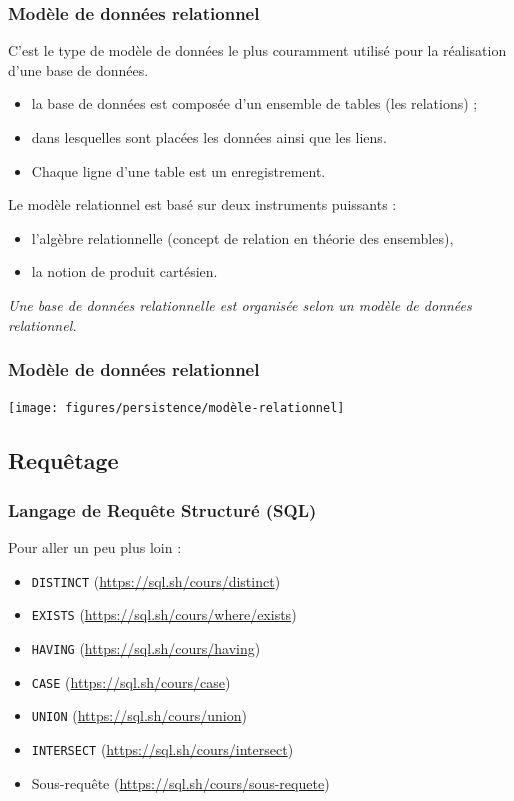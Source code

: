 \begin{frame}
    \frametitle{Modèle de données relationnel}

    C'est le type de modèle de données le plus couramment utilisé pour la réalisation d'une base de données.
    \begin{itemize}
        \item la base de données est composée d'un ensemble de tables (les relations) ;
        \item dans lesquelles sont placées les données ainsi que les liens.
        \item Chaque ligne d'une table est un enregistrement.
    \end{itemize}

    \bigskip
    Le modèle relationnel est basé sur deux instruments puissants :
    \begin{itemize}
        \item l’algèbre relationnelle (concept de relation en théorie des ensembles),
        \item la notion de produit cartésien.
    \end{itemize}

    \bigskip
    \emph{Une base de données relationnelle est organisée selon un modèle de données relationnel.}

\end{frame}

\begin{frame}
    \frametitle{Modèle de données relationnel}

    \centering
    \texttt{[image: figures/persistence/modèle-relationnel]}
\end{frame}

\subsection{Requêtage}

\begin{frame}
    \frametitle{Langage de Requête Structuré (SQL)}

    Pour aller un peu plus loin :
    \begin{itemize}
        \item \texttt{DISTINCT} (\url{https://sql.sh/cours/distinct})
        \item \texttt{EXISTS} (\url{https://sql.sh/cours/where/exists})
        \item \texttt{HAVING} (\url{https://sql.sh/cours/having})
        \item \texttt{CASE} (\url{https://sql.sh/cours/case})
        \item \texttt{UNION} (\url{https://sql.sh/cours/union})
        \item \texttt{INTERSECT} (\url{https://sql.sh/cours/intersect})
        \item Sous-requête (\url{https://sql.sh/cours/sous-requete})
    \end{itemize}
\end{frame}

